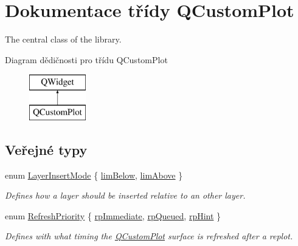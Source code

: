 \hypertarget{classQCustomPlot}{}\section{Dokumentace třídy Q\+Custom\+Plot}
\label{classQCustomPlot}


The central class of the library.  


Diagram dědičnosti pro třídu Q\+Custom\+Plot\begin{figure}[H]
\begin{center}
\leavevmode
\includegraphics[height=2.000000cm]{classQCustomPlot}
\end{center}
\end{figure}
\subsection*{Veřejné typy}
\begin{DoxyCompactItemize}
\item 
enum \hyperlink{classQCustomPlot_a75a8afbe6ef333b1f3d47abb25b9add7}{Layer\+Insert\+Mode} \{ \hyperlink{classQCustomPlot_a75a8afbe6ef333b1f3d47abb25b9add7aee39cf650cd24e68552da0b697ce4a93}{lim\+Below}, 
\hyperlink{classQCustomPlot_a75a8afbe6ef333b1f3d47abb25b9add7a062b0b7825650b432a713c0df6742d41}{lim\+Above}
 \}\begin{DoxyCompactList}\small\item\em Defines how a layer should be inserted relative to an other layer. \end{DoxyCompactList}
\item 
enum \hyperlink{classQCustomPlot_a45d61392d13042e712a956d27762aa39}{Refresh\+Priority} \{ \hyperlink{classQCustomPlot_a45d61392d13042e712a956d27762aa39a0d4831572370d871f2b7cb88806bac59}{rp\+Immediate}, 
\hyperlink{classQCustomPlot_a45d61392d13042e712a956d27762aa39aaaae083a19bc668597bf0f86e000f798}{rp\+Queued}, 
\hyperlink{classQCustomPlot_a45d61392d13042e712a956d27762aa39adfa1f2387617168d9299f4c8ad15b332}{rp\+Hint}
 \}\begin{DoxyCompactList}\small\item\em Defines with what timing the \hyperlink{classQCustomPlot}{Q\+Custom\+Plot} surface is refreshed after a replot. \end{DoxyCompactList}
\end{DoxyCompactItemize}
